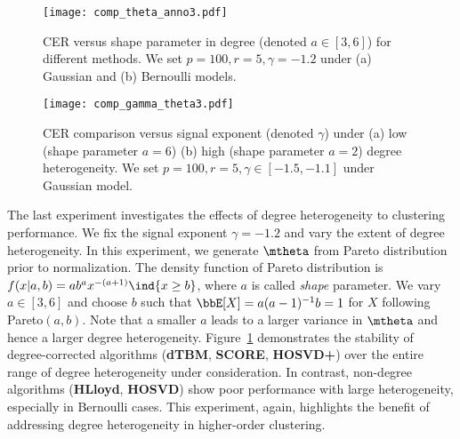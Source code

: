 \documentclass[lettersize,onecolumn,journal]{IEEEtran}
\theoremstyle{definition}
\theoremstyle{definition}
\begin{document}





\begin{figure}[h!]
    \centering
    \texttt{[image: comp\_theta\_anno3.pdf]}
    \caption{CER versus shape parameter in degree (denoted $a\in[3,6]$) for different methods. We set $p = 100, r = 5, \gamma = -1.2$ under (a) Gaussian and (b) Bernoulli models.}
    \label{fig:comp_theta}
\end{figure}



\begin{figure}[htp!]
    \centering
    \texttt{[image: comp\_gamma\_theta3.pdf]}
    \caption{CER comparison versus signal exponent (denoted $\gamma$) under (a) low (shape parameter $a = 6$)  (b) high (shape parameter $a = 2$) degree heterogeneity. We set $p = 100, r = 5, \gamma \in [-1.5, -1.1]$ under Gaussian model.}
    \label{fig:comp_gamma_theta}
\end{figure}

The last experiment investigates the effects of degree heterogeneity to clustering performance. We fix the signal exponent $\gamma = -1.2$ and vary the extent of degree heterogeneity. In this experiment, we generate $\mtheta$ from Pareto distribution prior to normalization. The density function of Pareto distribution is $f(x|a,b) = a b^a x^{-(a+1)} \ind\{ x \geq b \}$, where $a$ is called \emph{shape} parameter. We vary $a \in [3,6]$ and choose $b$ such that $\bbE[X] = a(a - 1)^{-1}b = 1$ for $X$ following Pareto$(a,b)$. Note that a smaller $a$ leads to a larger variance in $\mtheta$ and hence a larger degree heterogeneity. Figure~\ref{fig:comp_theta} demonstrates the stability of degree-corrected algorithms (\textbf{\small dTBM}, \textbf{\small SCORE}, \textbf{\small HOSVD+}) over the entire range of degree heterogeneity under consideration. In contrast, non-degree algorithms (\textbf{\small HLloyd}, \textbf{\small HOSVD}) show poor performance with large heterogeneity, especially in Bernoulli cases. This experiment, again, highlights the benefit of addressing degree heterogeneity in higher-order clustering. 
\end{document}
